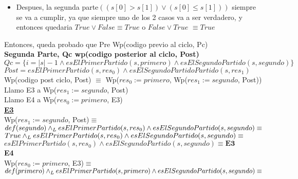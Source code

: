 \documentclass[10pt,a4paper]{article}
\begin{document}
\begin{enumerate}
\begin{itemize}
\item Despues, la segunda parte$((s[0] > s[1]) \lor (s[0] \leq s[1] ))$ siempre se va a cumplir, ya que siempre uno de los 2 casos va a ser verdadero, y entonces quedaria $True \lor False \equiv True$ o $False \lor True$ $\equiv True$
\end{itemize}
Entonces, queda probado que Pre \implica Wp(codigo previo al ciclo, Pc)
\vspace{0.3cm}
\\
\textbf{Segunda Parte, Qc \implica wp(codigo posterior al ciclo, Post)}
\vspace{0.3cm}
\\
$Qc = \{i= \vert s \vert -1 \land esElPrimerPartido(s, primero) \land esElSegundoPartido(s, segundo)\}$
\vspace{0.3cm}
\\
$Post = esElPrimerPartido(s, res_0) \land esElSegundoPartidoPartido(s, res_1)$ 
\vspace{0.3cm}
\\
Wp(codigo post ciclo, Post) $\equiv$ Wp($res_0:= primero$, Wp($res_1:= segundo$, Post))
\vspace{0.3cm}
\\
Llamo E3 a Wp($res_1:= segundo$, Post)
\vspace{0.3cm}
\\
Llamo E4 a Wp($res_0:= primero$, E3)
\vspace{0.3cm}
\\
\underline{\textbf{E3}}
\vspace{0.3cm}
\\
Wp($res_1:= segundo$, Post)$\equiv$
\vspace{0.3cm}
\\
$def(segundo) \land _L esElPrimerPartido(s, res_0) \land esElSegundoPartido(s, segundo) \equiv$
\vspace{0.3cm}
\\
$True \land _L esElPrimerPartido(s, res_0) \land esElSegundoPartido(s, segundo) \equiv$
\vspace{0.3cm}
\\
$esElPrimerPartido(s, res_0) \land esElSegundoPartido(s, segundo) \equiv \textbf{E3}$
\vspace{0.3cm}
\\
\textbf{E4}
\vspace{0.3cm}
\\
Wp($res_0:= primero$, E3)$\equiv$
\vspace{0.3cm}
\\
$def(primero) \land _L esElPrimerPartido(s, primero) \land esElSegundoPartido(s, segundo)\equiv$

\end{enumerate}
\end{document}
